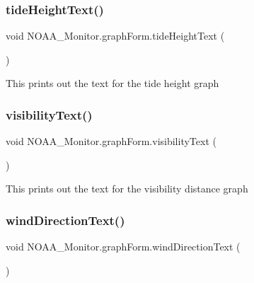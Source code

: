 \subsubsection{\texorpdfstring{tide\+Height\+Text()}{tideHeightText()}}
{\footnotesize\ttfamily void N\+O\+A\+A\+\_\+\+Monitor.\+graph\+Form.\+tide\+Height\+Text (\begin{DoxyParamCaption}{ }\end{DoxyParamCaption})\hspace{0.3cm}{\ttfamily [inline]}}

This prints out the text for the tide height graph \mbox{\label{class_n_o_a_a___monitor_1_1graph_form_a3501fbf78761a0d1ff1a9a22326355ba}} 
\subsubsection{\texorpdfstring{visibility\+Text()}{visibilityText()}}
{\footnotesize\ttfamily void N\+O\+A\+A\+\_\+\+Monitor.\+graph\+Form.\+visibility\+Text (\begin{DoxyParamCaption}{ }\end{DoxyParamCaption})\hspace{0.3cm}{\ttfamily [inline]}}

This prints out the text for the visibility distance graph \mbox{\label{class_n_o_a_a___monitor_1_1graph_form_a88390ff163a7aef5b5f5a653f2b3452e}} 
\subsubsection{\texorpdfstring{wind\+Direction\+Text()}{windDirectionText()}}
{\footnotesize\ttfamily void N\+O\+A\+A\+\_\+\+Monitor.\+graph\+Form.\+wind\+Direction\+Text (\begin{DoxyParamCaption}{ }\end{DoxyParamCaption})\hspace{0.3cm}{\ttfamily [inline]}}

